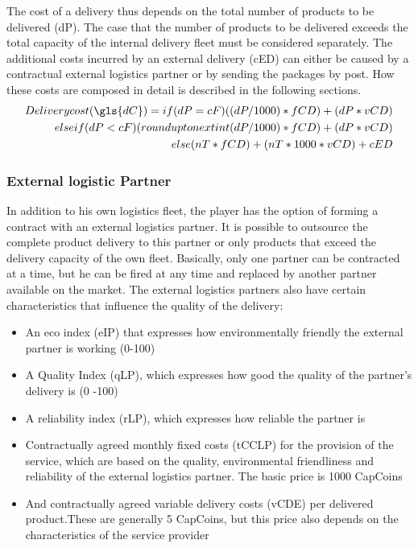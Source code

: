 The cost of a delivery thus depends on the total number of products to be delivered (\gls{dP}). 
The case that the number of products to be delivered exceeds the total capacity of the internal delivery fleet must be considered separately. The additional costs incurred by an external delivery (\gls{cED}) can either be caused by a contractual external logistics partner or by sending the packages by post. How these costs are composed in detail is described in the following sections. 
\begin{equation}
\begin{aligned}
Delivery cost (\gls{dC}) = if ( dP = cF ) { (( dP / 1000) * fCD) + ( dP * vCD) } \\
elseif ( dP < cF ) { (round up to next int ( dP / 1000) * fCD ) + ( dP * vCD) } \\
else { ( nT * fCD ) + ( nT *1000 * vCD ) + cED }
\end{aligned}
\end{equation}

\subsubsection{External logistic Partner}
In addition to his own logistics fleet, the player has the option of forming a contract with an external logistics partner. It is possible to outsource the complete product delivery to this partner or only products that exceed the delivery capacity of the own fleet. Basically, only one partner can be contracted at a time, but he can be fired at any time and replaced by another partner available on the market. 
The external logistics partners also have certain characteristics that influence the quality of the delivery: 

\begin{itemize}
    \item An eco index (\gls{eIP}) that expresses how environmentally friendly the external partner is working (0-100)
    \item A Quality Index (\gls{qLP}), which expresses how good the quality of the partner's delivery is (0 -100)
    \item A reliability index (\gls{rLP}), which expresses how reliable the partner is
    \item Contractually agreed monthly fixed costs (\gls{tCCLP}) for the provision of the service, which are based on the quality, environmental friendliness and reliability of the external logistics partner. The basic price is 1000 CapCoins 
    \item And contractually agreed variable delivery costs (\gls{vCDE}) per delivered product.These are generally 5 CapCoins, but this price also depends on the characteristics of the service provider
\end{itemize}

